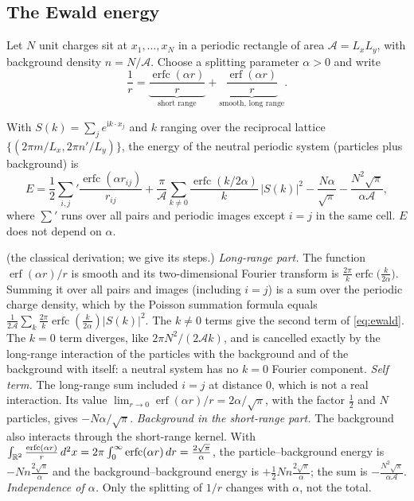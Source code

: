 \subsection{The Ewald energy}
Let $N$ unit charges sit at $x_1,\dots,x_N$ in a periodic rectangle of area $\mathcal A=L_xL_y$, with background density
$n=N/\mathcal A$. Choose a splitting parameter $\alpha>0$ and write
\begin{equation}
\frac1r=\underbrace{\frac{\operatorname{erfc}(\alpha r)}{r}}_{\text{short range}}+\underbrace{\frac{\operatorname{erf}(\alpha r)}{r}}_{\text{smooth, long range}} .
\end{equation}
\begin{proposition}\label{prop:ewald}
With $S(k)=\sum_je^{\mathrm ik\cdot x_j}$ and $k$ ranging over the reciprocal lattice $\{(2\pi m/L_x,2\pi n'/L_y)\}$,
the energy of the neutral periodic system (particles plus background) is
\begin{equation}\label{eq:ewald}
E=\frac12{\sum_{i,j}}'\frac{\operatorname{erfc}(\alpha r_{ij})}{r_{ij}}
+\frac{\pi}{\mathcal A}\sum_{k\ne0}\frac{\operatorname{erfc}(k/2\alpha)}{k}\,|S(k)|^2
-\frac{N\alpha}{\sqrt\pi}-\frac{N^2\sqrt\pi}{\alpha\mathcal A},
\end{equation}
where $\sum'$ runs over all pairs and periodic images except $i=j$ in the same cell. $E$ does not depend on $\alpha$.
\end{proposition}
\begin{humanproof}
\tierC{} (the classical derivation; we give its steps.)
\emph{Long-range part.} The function $\operatorname{erf}(\alpha r)/r$ is smooth and its two-dimensional Fourier
transform is $\frac{2\pi}{k}\operatorname{erfc}\bigl(\frac{k}{2\alpha}\bigr)$. Summing it over all pairs and images
(including $i=j$) is a sum over the periodic charge density, which by the Poisson summation formula equals
$\frac1{2\mathcal A}\sum_k\frac{2\pi}k\operatorname{erfc}(\frac k{2\alpha})|S(k)|^2$. The $k\ne0$ terms give the
second term of \eqref{eq:ewald}. The $k=0$ term diverges, like $2\pi N^2/(2\mathcal A k)$, and is cancelled exactly by
the long-range interaction of the particles with the background and of the background with itself: a neutral system
has no $k=0$ Fourier component.
\emph{Self term.} The long-range sum included $i=j$ at distance $0$, which is not a real interaction. Its value
$\lim_{r\to0}\operatorname{erf}(\alpha r)/r=2\alpha/\sqrt\pi$, with the factor $\frac12$ and $N$ particles, gives
$-N\alpha/\sqrt\pi$.
\emph{Background in the short-range part.} The background also interacts through the short-range kernel. With
$\int_{\mathbb{R}^2}\frac{\operatorname{erfc}(\alpha r)}r\,d^2x=2\pi\int_0^\infty\operatorname{erfc}(\alpha r)\,dr=\frac{2\sqrt\pi}\alpha$,
the particle--background energy is $-Nn\frac{2\sqrt\pi}\alpha$ and the background--background energy is
$+\frac12Nn\frac{2\sqrt\pi}\alpha$; the sum is $-\frac{N^2\sqrt\pi}{\alpha\mathcal A}$.
\emph{Independence of $\alpha$.} Only the splitting of $1/r$ changes with $\alpha$, not the total.
\end{humanproof}


